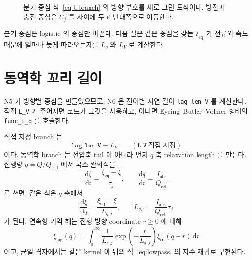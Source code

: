 \documentclass[11pt,a4paper]{article}
\newcommand{\dd}{\mathrm{d}}
\newcommand{\cellc}{\mathrm{cell}}
\newcommand{\eq}{\mathrm{eq}}
\newcommand{\abs}{\mathrm{abs}}
\begin{document}
\begin{figure}[t]
\centering
{}
\caption{분기 중심 식~\eqref{eq:Ubranch} 의 방향 부호를 새로 그린 도식이다. 방전과 충전 중심은 $U_j$ 를 사이에 두고 반대쪽으로 이동한다.}
\label{fig:hys}
\end{figure}

분기 중심은 logistic 의 중심만 바꾼다. 다음 절은 같은 중심을 갖는 $\xi_{\eq}$ 가 전류와 속도 때문에 얼마나 늦게 따라오는지를 $L_q$ 와 $L_V$ 로 계산한다.

\section{동역학 꼬리 길이}\label{sec:n6}
N5 가 방향별 중심을 만들었으므로, N6 은 전이별 지연 길이 \texttt{lag\_len\_V} 를 계산한다. 직접 \texttt{L\_V} 가 주어지면 코드가 그것을 사용하고, 아니면 Eyring--Butler--Volmer 형태의 \texttt{func\_L\_q} 를 호출한다.

직접 지정 branch 는
\begin{equation}
\texttt{lag\_len\_V}=L_V\qquad(\texttt{L\_V}\ \text{직접 지정})
\label{eq:LVoverride}
\end{equation}
이다. 동역학 branch 는 전압축 tail 이 아니라 먼저 $q$ 축 relaxation length 를 만든다. 진행량 $q=Q/Q_{\cellc}$ 에서 국소 완화식을
\begin{equation}
\frac{\dd \xi}{\dd t}=\frac{\xi_{\eq}-\xi}{\tau_j},
\qquad
\frac{\dd q}{\dd t}=\frac{I_{\abs}}{Q_{\cellc}}
\label{eq:tautokuq}
\end{equation}
로 쓰면, 같은 식은 $q$ 축에서
\begin{equation}
\frac{\dd \xi}{\dd q}=\frac{\xi_{\eq}-\xi}{L_{q,j}},
\qquad
L_{q,j}=\frac{I_{\abs}}{Q_{\cellc}}\tau_j
\label{eq:Lqmotivation}
\end{equation}
가 된다. 연속형 기억 해는 진행 방향 coordinate $r\ge0$ 에 대해
\begin{equation}
\xi_{\mathrm{lag}}(q)=\int_{0}^{\infty}\frac{1}{L_{q,j}}
\exp\!\left(-\frac{r}{L_{q,j}}\right)\xi_{\eq}(q-r)\,\dd r
\label{eq:Lqintegral}
\end{equation}
이고, 균일 격자에서는 같은 kernel 이 뒤의 식~\eqref{eq:lowpass} 의 지수 재귀로 구현된다.
\end{document}
